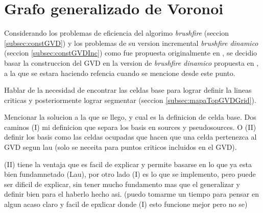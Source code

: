 





\section{Grafo generalizado de Voronoi}\label{sec:MiConstGVD}

Considerando los problemas de eficiencia del algorimo \emph{brushfire} (seccion
\ref{subsec:constGVD}) y los problemas de su version incremental
\emph{brushfire dinamico} (seccion \ref{subsec:constGVDInc}) como fue propuesta
originalmente en \cite{kalra2009incremental}, se decidio basar la construccion
del GVD en la version de \emph{brushfire dinamico} propuesta en \cite{Lau2013},
a la que se estara haciendo refencia cuando se mencione  desde este punto.

Hablar de la necesidad de encontrar las celdas base para lograr definir la
lineas criticas y posteriormente lograr segmentar (seccion \ref{subsec:mapaTopGVDGrid}).

Mencionar la solucion a la que se llego, y cual es la definicion de celda base.
Dos caminos (I) mi definicion que separa los basis en sources y pseudosources. O (II)
definir los basis como las celdas ocupadas que hacen que una celda pertenezca
al GVD segun lau (solo se neceita para puntos criticos incluidos en el GVD). 

(II) tiene la ventaja que es facil de explicar y permite basarse en lo que ya
esta bien fundamnetado (Lau), por otro lado (I) es lo que se implemento, pero
puede ser dificil de explicar, sin tener mucho fundamento mas que el
generalizar y definir bien para el haberlo hecho asi. (puedo tomarme un tiempo
para pensar en algun acaso claro y facil de epxlicar donde (I) esto funcione
mejor pero no se)

